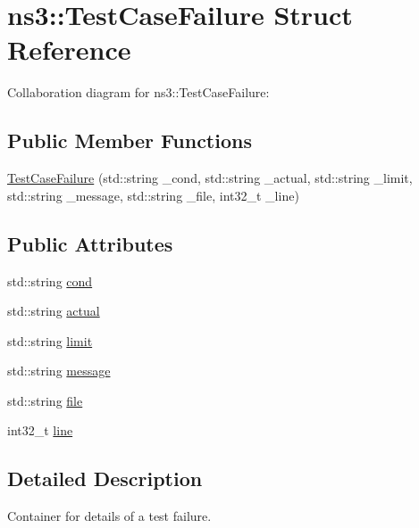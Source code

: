 \hypertarget{structns3_1_1TestCaseFailure}{}\section{ns3\+:\+:Test\+Case\+Failure Struct Reference}
\label{structns3_1_1TestCaseFailure}


Collaboration diagram for ns3\+:\+:Test\+Case\+Failure\+:
\subsection*{Public Member Functions}
\begin{DoxyCompactItemize}
\item 
\hyperlink{structns3_1_1TestCaseFailure_a9b6c07d5d2f82113321091fe5491e6b9}{Test\+Case\+Failure} (std\+::string \+\_\+cond, std\+::string \+\_\+actual, std\+::string \+\_\+limit, std\+::string \+\_\+message, std\+::string \+\_\+file, int32\+\_\+t \+\_\+line)
\end{DoxyCompactItemize}
\subsection*{Public Attributes}
\begin{DoxyCompactItemize}
\item 
std\+::string \hyperlink{structns3_1_1TestCaseFailure_ac0d5c925c226440de69d3446bb3b57be}{cond}
\item 
std\+::string \hyperlink{structns3_1_1TestCaseFailure_a0c0a29e84c112f65b5c024ef5f1d1b56}{actual}
\item 
std\+::string \hyperlink{structns3_1_1TestCaseFailure_adfcc28f97df7dce78629ee21d11e1f41}{limit}
\item 
std\+::string \hyperlink{structns3_1_1TestCaseFailure_a293e13164cefcd1f8758eada2018fa0d}{message}
\item 
std\+::string \hyperlink{structns3_1_1TestCaseFailure_a0c6ec0124617a83d9fa69e9f788e2065}{file}
\item 
int32\+\_\+t \hyperlink{structns3_1_1TestCaseFailure_a49a39a3dea2bc673abf2fedf78f67ebe}{line}
\end{DoxyCompactItemize}


\subsection{Detailed Description}
Container for details of a test failure. 


